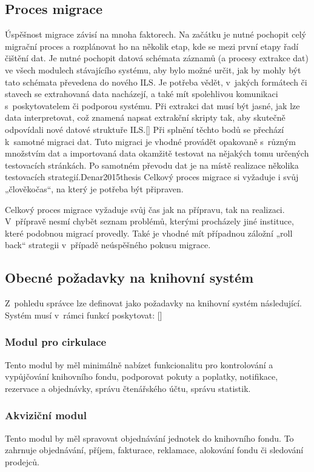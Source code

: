 \documentclass[
	11pt, oneside, printed, draft, 
	table,   %
	lof,     %
	lot     %
]{fithesis3}
\newcommand{\citepages}[2]{[\cite[#1]{#2}]}
\begin{document}
{\subsection{Proces migrace}
Úspěšnost migrace závisí na mnoha faktorech. Na začátku je nutné pochopit celý migrační proces a rozplánovat ho na několik etap, kde se mezi první etapy řadí čištění dat. Je nutné pochopit datová schémata záznamů (a procesy extrakce dat) ve všech modulech stávajícího systému, aby bylo možné určit, jak by mohly být tato schémata převedena do nového ILS. Je potřeba vědět, v~jakých formátech či stavech se extrahovaná data nacházejí, a také mít spolehlivou komunikaci s~poskytovatelem či podporou systému. Při extrakci dat musí být jasné, jak lze data interpretovat, což znamená napsat extrakční skripty tak, aby skutečně odpovídali nové datové struktuře ILS.\citepages{43-48}{krbiwFHfrnvG2ZXf} Při splnění těchto bodů se přechází k~samotné migraci dat. Tuto migraci je vhodné provádět opakovaně s~různým množstvím dat a importovaná data okamžitě testovat na nějakých tomu určených testovacích stránkách. Po samotném převodu dat je na místě realizace několika testovacích strategií.\cite{32-35, 61-72}{Denar2015thesis} Celkový proces migrace si vyžaduje i svůj „člověkočas“, na který je potřeba být připraven.

Celkový proces migrace vyžaduje svůj čas jak na přípravu, tak na realizaci. V~přípravě nesmí chybět seznam problémů, kterými procházely jiné instituce, které podobnou migrací provedly. Také je vhodné mít případnou záložní „roll back“ strategii v~případě neúspěšného pokusu migrace.

\subsection{Obecné požadavky na knihovní systém}
Z~pohledu správce lze definovat jako požadavky na knihovní systém následující.
Systém musí v~rámci funkcí poskytovat: \citepages{8-12}{bilal_c2014}

\subsubsection{Modul pro cirkulace}
Tento modul by měl minimálně nabízet funkcionalitu pro kontrolování a vypůjčování knihovního fondu, podporovat pokuty a poplatky, notifikace, rezervace a objednávky, správu čtenářského účtu, správu statistik.

\subsubsection{Akviziční modul}
Tento modul by měl spravovat objednávání jednotek do knihovního fondu. To zahrnuje objednávání, příjem, fakturace, reklamace, alokování fondu či sledování prodejců. 

}
\end{document}
